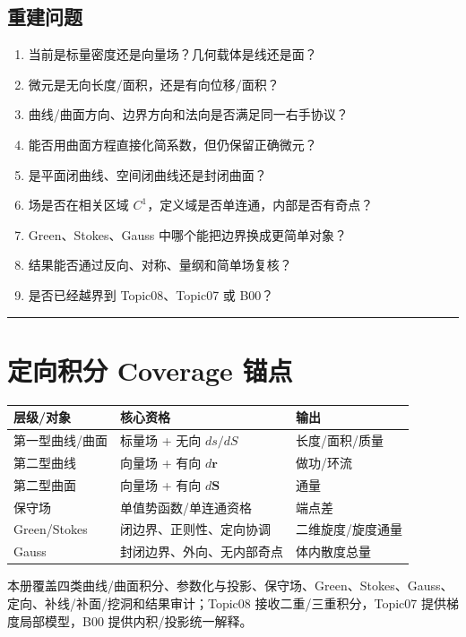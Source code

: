 \documentclass[11pt,a4paper,fontset=fandol]{ctexart}
\begin{document}
\subsection{重建问题}
\begin{enumerate}
  \item 当前是标量密度还是向量场？几何载体是线还是面？
  \item 微元是无向长度/面积，还是有向位移/面积？
  \item 曲线/曲面方向、边界方向和法向是否满足同一右手协议？
  \item 能否用曲面方程直接化简系数，但仍保留正确微元？
  \item 是平面闭曲线、空间闭曲线还是封闭曲面？
  \item 场是否在相关区域 $C^1$，定义域是否单连通，内部是否有奇点？
  \item Green、Stokes、Gauss 中哪个能把边界换成更简单对象？
  \item 结果能否通过反向、对称、量纲和简单场复核？
  \item 是否已经越界到 Topic08、Topic07 或 B00？
\end{enumerate}

\begin{center}\rule{0.5\linewidth}{0.5pt}\end{center}
\appendix
\section{定向积分 Coverage 锚点}
\begin{center}
\begin{tabular}{L{2.55cm}L{5.15cm}L{\dimexpr\linewidth-7.70cm\relax}}
\toprule
层级/对象 & 核心资格 & 输出\\
\midrule
第一型曲线/曲面 & 标量场 + 无向 $ds/dS$ & 长度/面积/质量\\
第二型曲线 & 向量场 + 有向 $d\mathbf r$ & 做功/环流\\
第二型曲面 & 向量场 + 有向 $d\mathbf S$ & 通量\\
保守场 & 单值势函数/单连通资格 & 端点差\\
Green/Stokes & 闭边界、正则性、定向协调 & 二维旋度/旋度通量\\
Gauss & 封闭边界、外向、无内部奇点 & 体内散度总量\\
\bottomrule
\end{tabular}
\end{center}

本册覆盖四类曲线/曲面积分、参数化与投影、保守场、Green、Stokes、Gauss、定向、补线/补面/挖洞和结果审计；Topic08 接收二重/三重积分，Topic07 提供梯度局部模型，B00 提供内积/投影统一解释。
\end{document}
